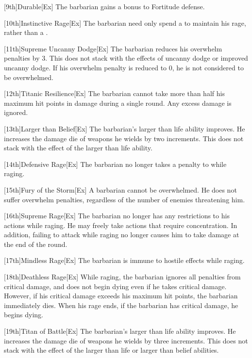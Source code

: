         [9th]{Durable}[Ex]
        The barbarian gains a  bonus to Fortitude defense.

        [10th]{Instinctive Rage}[Ex]
        The barbarian need only spend a  to maintain his rage, rather than a .

        [11th]{Supreme Uncanny Dodge}[Ex]
        The barbarian reduces his overwhelm penalties by 3.
        This does not stack with the effects of uncanny dodge or improved uncanny dodge.
        If his overwhelm penalty is reduced to 0, he is not considered to be overwhelmed.

        [12th]{Titanic Resilience}[Ex]
        The barbarian cannot take more than half his maximum hit points in damage during a single round.
        Any excess damage is ignored.

        [13th]{Larger than Belief}[Ex]
        The barbarian's larger than life ability improves.
        He increases the damage die of weapons he wields by two increments.
        This does not stack with the effect of the larger than life ability.

        [14th]{Defensive Rage}[Ex]
        The barbarian no longer takes a penalty to  while raging.

        [15th]{Fury of the Storm}[Ex]
        A barbarian cannot be overwhelmed.
        He does not suffer overwhelm penalties, regardless of the number of enemies threatening him.

        [16th]{Supreme Rage}[Ex]
        The barbarian no longer has any restrictions to his actions while raging.
        He may freely take actions that require concentration.
        In addition, failing to attack while raging no longer causes him to take damage at the end of the round.

        [17th]{Mindless Rage}[Ex]
        The barbarian is immune to hostile  effects while raging.

        [18th]{Deathless Rage}[Ex]
        While raging, the barbarian ignores all penalties from critical damage, and does not begin dying even if he takes critical damage.
        However, if his critical damage exceeds his maximum hit points, the barbarian immediately dies.
        When his rage ends, if the barbarian has critical damage, he begins dying.

        [19th]{Titan of Battle}[Ex]
        The barbarian's larger than life ability improves.
        He increases the damage die of weapons he wields by three increments.
        This does not stack with the effect of the larger than life or larger than belief abilities.

